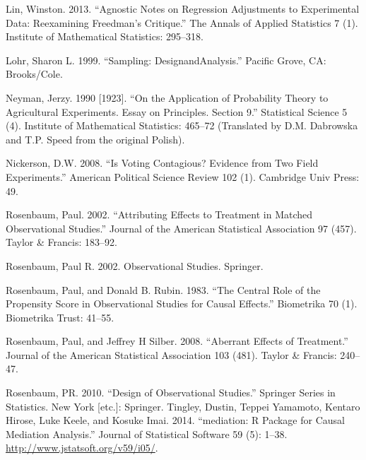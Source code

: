 \documentclass[
]{article}
\begin{document}
Lin, Winston. 2013. ``Agnostic Notes on Regression Adjustments to
Experimental Data: Reexamining Freedman's Critique.'' The Annals of
Applied Statistics 7 (1). Institute of Mathematical Statistics:
295--318.

Lohr, Sharon L. 1999. ``Sampling: DesignandAnalysis.'' Pacific Grove,
CA: Brooks/Cole.

Neyman, Jerzy. 1990 {[}1923{]}. ``On the Application of Probability
Theory to Agricultural Experiments. Essay on Principles. Section 9.''
Statistical Science 5 (4). Institute of Mathematical Statistics: 465--72
(Translated by D.M. Dabrowska and T.P. Speed from the original Polish).

Nickerson, D.W. 2008. ``Is Voting Contagious? Evidence from Two Field
Experiments.'' American Political Science Review 102 (1). Cambridge Univ
Press: 49.

Rosenbaum, Paul. 2002. ``Attributing Effects to Treatment in Matched
Observational Studies.'' Journal of the American Statistical Association
97 (457). Taylor \& Francis: 183--92.

Rosenbaum, Paul R. 2002. Observational Studies. Springer.

Rosenbaum, Paul, and Donald B. Rubin. 1983. ``The Central Role of the
Propensity Score in Observational Studies for Causal Effects.''
Biometrika 70 (1). Biometrika Trust: 41--55.

Rosenbaum, Paul, and Jeffrey H Silber. 2008. ``Aberrant Effects of
Treatment.'' Journal of the American Statistical Association 103 (481).
Taylor \& Francis: 240--47.

Rosenbaum, PR. 2010. ``Design of Observational Studies.'' Springer
Series in Statistics. New York {[}etc.{]}: Springer. Tingley, Dustin,
Teppei Yamamoto, Kentaro Hirose, Luke Keele, and Kosuke Imai. 2014.
``mediation: R Package for Causal Mediation Analysis.'' Journal of
Statistical Software 59 (5): 1--38.
\url{http://www.jstatsoft.org/v59/i05/}.
\end{document}
